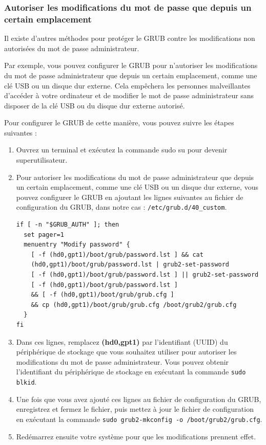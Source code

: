 \documentclass[12pt,a4paper]{article}
\newcommand{\code}[1]{\colorbox{light-gray}{\texttt{#1}}}
\begin{document}
        \newpage
        \subsubsection{Autoriser les modifications du mot de passe que depuis un certain emplacement}
        \begin{flushleft}
            \noindent Il existe d'autres méthodes pour protéger le GRUB contre les modifications non autorisées du mot de passe administrateur. 
            \item Par exemple, vous pouvez configurer le GRUB pour n'autoriser les modifications du mot de passe administrateur que depuis un certain emplacement, comme une clé USB ou un disque dur externe. Cela empêchera les personnes malveillantes d'accéder à votre ordinateur et de modifier le mot de passe administrateur sans disposer de la clé USB ou du disque dur externe autorisé.
             \item Pour configurer le GRUB de cette manière, vous pouvez suivre les étapes suivantes :
            \begin{enumerate}
                \item Ouvrez un terminal et exécutez la commande sudo su pour devenir superutilisateur.
                \item Pour autoriser les modifications du mot de passe administrateur que depuis un certain emplacement, comme une clé USB ou un disque dur externe, vous pouvez configurer le GRUB en ajoutant les lignes suivantes au fichier de configuration du GRUB, dans notre cas : \code{/etc/grub.d/40\_custom}.
                \begin{lstlisting}
if [ -n "$GRUB_AUTH" ]; then
  set pager=1
  menuentry "Modify password" {
    [ -f (hd0,gpt1)/boot/grub/password.lst ] && cat
    (hd0,gpt1)/boot/grub/password.lst | grub2-set-password
    [ -f (hd0,gpt1)/boot/grub/password.lst ] || grub2-set-password
    [ -f (hd0,gpt1)/boot/grub/password.lst ] 
    && [ -f (hd0,gpt1)/boot/grub/grub.cfg ] 
    && cp (hd0,gpt1)/boot/grub/grub.cfg /boot/grub2/grub.cfg
  }
fi
                \end{lstlisting}
                \item Dans ces lignes, remplacez \textbf{(hd0,gpt1)} par l'identifiant (UUID) du périphérique de stockage que vous souhaitez utiliser pour autoriser les modifications du mot de passe administrateur. Vous pouvez obtenir l'identifiant du périphérique de stockage en exécutant la commande \code{sudo blkid}.
                \item Une fois que vous avez ajouté ces lignes au fichier de configuration du GRUB, enregistrez et fermez le fichier, puis mettez à jour le fichier de configuration en exécutant la commande \code{sudo grub2-mkconfig -o /boot/grub2/grub.cfg}. \item Redémarrez ensuite votre système pour que les modifications prennent effet.

\end{enumerate}
\end{flushleft}
\end{document}
